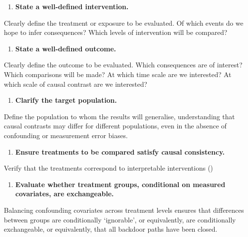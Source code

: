 \documentclass[
  single column]{article}
\providecommand{\tightlist}{%
  \setlength{\itemsep}{0pt}\setlength{\parskip}{0pt}}\usepackage{longtable,booktabs,array}
\begin{document}
\begin{enumerate}
\def\labelenumi{\arabic{enumi}.}
\tightlist
\item
  \textbf{State a well-defined intervention.}
\end{enumerate}

Clearly define the treatment or exposure to be evaluated. Of which
events do we hope to infer consequences? Which levels of intervention
will be compared?

\begin{enumerate}
\def\labelenumi{\arabic{enumi}.}
\setcounter{enumi}{1}
\tightlist
\item
  \textbf{State a well-defined outcome.}
\end{enumerate}

Clearly define the outcome to be evaluated. Which consequences are of
interest? Which comparisons will be made? At which time scale are we
interested? At which scale of causal contrast are we interested?

\begin{enumerate}
\def\labelenumi{\arabic{enumi}.}
\setcounter{enumi}{2}
\tightlist
\item
  \textbf{Clarify the target population.}
\end{enumerate}

Define the population to whom the results will generalise, understanding
that causal contrasts may differ for different populations, even in the
absence of confounding or measurement error biases.

\begin{enumerate}
\def\labelenumi{\arabic{enumi}.}
\setcounter{enumi}{3}
\tightlist
\item
  \textbf{Ensure treatments to be compared satisfy causal consistency.}
\end{enumerate}

Verify that the treatments correspond to interpretable interventions
()

\begin{enumerate}
\def\labelenumi{\arabic{enumi}.}
\setcounter{enumi}{4}
\tightlist
\item
  \textbf{Evaluate whether treatment groups, conditional on measured
  covariates, are exchangeable.}
\end{enumerate}

Balancing confounding covariates across treatment levels ensures that
differences between groups are conditionally `ignorable', or
equivalently, are conditionally exchangeable, or equivalently, that all
backdoor paths have been closed.
\end{document}
